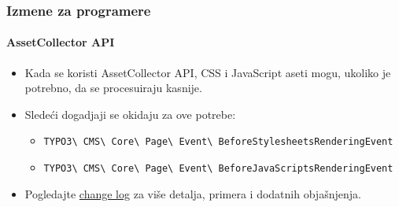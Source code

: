 \begin{frame}[fragile]
	\frametitle{Izmene za programere}
	\framesubtitle{AssetCollector API}

	\begin{itemize}
		\item Kada se koristi AssetCollector API, CSS i JavaScript aseti
			 mogu, ukoliko je potrebno, da se procesuiraju kasnije.
		\item Sledeći dogadjaji se okidaju za ove potrebe:
			\begin{itemize}\smaller
				\item \texttt{TYPO3\textbackslash
					CMS\textbackslash
					Core\textbackslash
					Page\textbackslash
					Event\textbackslash
					BeforeStylesheetsRenderingEvent}
				\item \texttt{TYPO3\textbackslash
					CMS\textbackslash
					Core\textbackslash
					Page\textbackslash
					Event\textbackslash
					BeforeJavaScriptsRenderingEvent}
			\end{itemize}

		\item Pogledajte
			\href{https://docs.typo3.org/c/typo3/cms-core/master/en-us/Changelog/10.4/Feature-90899-IntroduceAssetPreRenderingEvents.html}{change log}
			za više detalja, primera i dodatnih objašnjenja.
	\end{itemize}

\end{frame}

